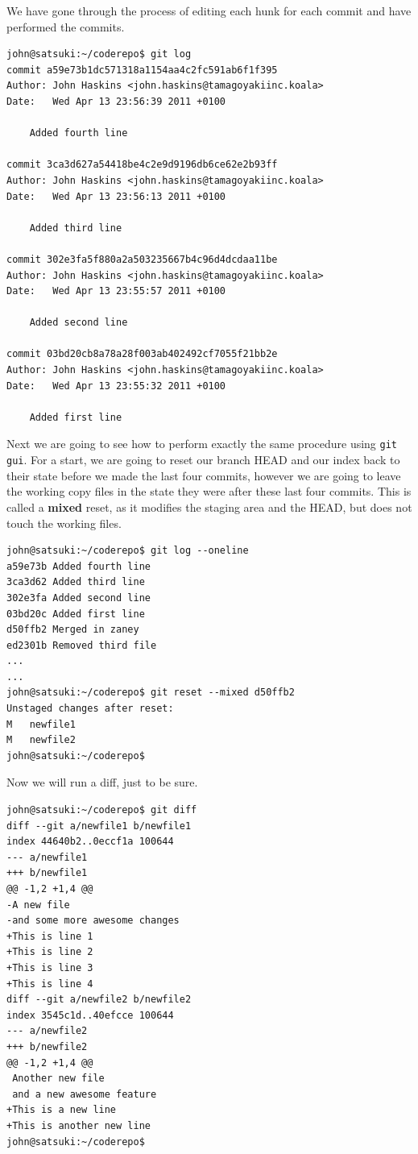 We have gone through the process of editing each hunk for each commit and have performed the commits.  

\begin{Verbatim}
john@satsuki:~/coderepo$ git log
commit a59e73b1dc571318a1154aa4c2fc591ab6f1f395
Author: John Haskins <john.haskins@tamagoyakiinc.koala>
Date:   Wed Apr 13 23:56:39 2011 +0100

    Added fourth line

commit 3ca3d627a54418be4c2e9d9196db6ce62e2b93ff
Author: John Haskins <john.haskins@tamagoyakiinc.koala>
Date:   Wed Apr 13 23:56:13 2011 +0100

    Added third line

commit 302e3fa5f880a2a503235667b4c96d4dcdaa11be
Author: John Haskins <john.haskins@tamagoyakiinc.koala>
Date:   Wed Apr 13 23:55:57 2011 +0100

    Added second line

commit 03bd20cb8a78a28f003ab402492cf7055f21bb2e
Author: John Haskins <john.haskins@tamagoyakiinc.koala>
Date:   Wed Apr 13 23:55:32 2011 +0100

    Added first line
\end{Verbatim}

Next we are going to see how to perform exactly the same procedure using \texttt{git gui}.  For a start, we are going to reset our branch HEAD and our index back to their state before we made the last four commits, however we are going to leave the working copy files in the state they were after these last four commits.  This is called a \textbf{mixed} reset, as it modifies the staging area and the HEAD, but does not touch the working files.

\begin{Verbatim}
john@satsuki:~/coderepo$ git log --oneline
a59e73b Added fourth line
3ca3d62 Added third line
302e3fa Added second line
03bd20c Added first line
d50ffb2 Merged in zaney
ed2301b Removed third file
...
...
john@satsuki:~/coderepo$ git reset --mixed d50ffb2
Unstaged changes after reset:
M	newfile1
M	newfile2
john@satsuki:~/coderepo$ 
\end{Verbatim}

Now we will run a diff, just to be sure.

\begin{Verbatim}
john@satsuki:~/coderepo$ git diff
diff --git a/newfile1 b/newfile1
index 44640b2..0eccf1a 100644
--- a/newfile1
+++ b/newfile1
@@ -1,2 +1,4 @@
-A new file
-and some more awesome changes
+This is line 1
+This is line 2
+This is line 3
+This is line 4
diff --git a/newfile2 b/newfile2
index 3545c1d..40efcce 100644
--- a/newfile2
+++ b/newfile2
@@ -1,2 +1,4 @@
 Another new file
 and a new awesome feature
+This is a new line
+This is another new line
john@satsuki:~/coderepo$ 
\end{Verbatim}

